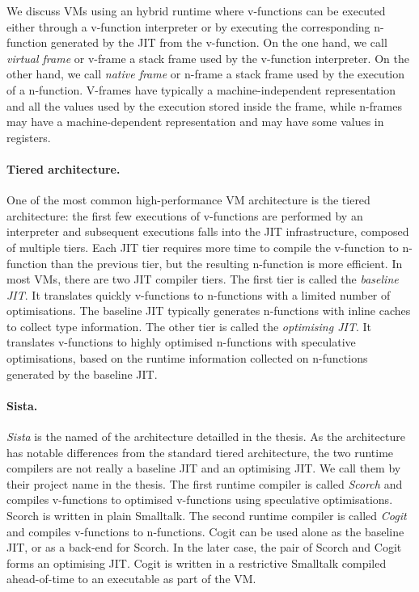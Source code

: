 \documentclass[a4paper,12pt,twoside]{../includes/ThesisStyle}
\begin{document}
We discuss VMs using an hybrid runtime where v-functions can be executed either through a v-function interpreter or by executing the corresponding n-function generated by the JIT from the v-function. On the one hand, we call \emph{virtual frame} or v-frame a stack frame used by the v-function interpreter. On the other hand, we call \emph{native frame} or n-frame a stack frame used by the execution of a n-function. V-frames have typically a machine-independent representation and all the values used by the execution stored inside the frame, while n-frames may have a machine-dependent representation and may have some values in registers.

\paragraph{Tiered architecture.} One of the most common high-performance VM architecture is the tiered architecture: the first few executions of v-functions are performed by an interpreter and subsequent executions falls into the JIT infrastructure, composed of multiple tiers. Each JIT tier requires more time to compile the v-function to n-function than the previous tier, but the resulting n-function is more efficient. In most VMs, there are two JIT compiler tiers. The first tier is called the \emph{baseline JIT}. It translates quickly v-functions to n-functions with a limited number of optimisations. The baseline JIT typically generates n-functions with inline caches to collect type information. The other tier is called the \emph{optimising JIT}. It translates v-functions to highly optimised n-functions with speculative optimisations, based on the runtime information collected on n-functions generated by the baseline JIT.

\paragraph{Sista.} \emph{Sista} is the named of the architecture detailled in the thesis. As the architecture has notable differences from the standard tiered architecture, the two runtime compilers are not really a baseline JIT and an optimising JIT. We call them by their project name in the thesis. The first runtime compiler is called \emph{Scorch} and compiles v-functions to optimised v-functions using speculative optimisations. Scorch is written in plain Smalltalk. The second runtime compiler is called \emph{Cogit} and compiles v-functions to n-functions. Cogit can be used alone as the baseline JIT, or as a back-end for Scorch. In the later case, the pair of Scorch and Cogit forms an optimising JIT. Cogit is written in a restrictive Smalltalk compiled ahead-of-time to an executable as part of the VM. 
\end{document}
